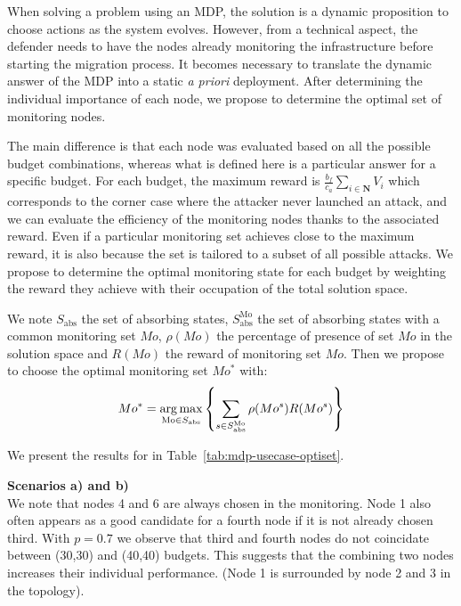 When solving a problem using an MDP, the solution is a dynamic proposition to choose actions as the system evolves.
However, from a technical aspect, the defender needs to have the nodes already monitoring the infrastructure before starting the migration process.
It becomes necessary to translate the dynamic answer of the MDP into a static \textit{a priori} deployment.
After determining the individual importance of each node, we propose to determine the optimal set of monitoring nodes.

The main difference is that each node was evaluated based on all the possible budget combinations, whereas what is defined here is a particular answer for a specific budget.
For each budget, the maximum reward is $\frac{b_f}{c_a} \sum\limits_{i \in \textbf{N}}V_i $ which corresponds to the corner case where the attacker never launched an attack, and we can evaluate the efficiency of the   monitoring nodes thanks to the associated reward.
Even if a particular monitoring set achieves close to the maximum reward, it is also because the set is tailored to a subset of all possible attacks.
We propose to determine the optimal monitoring state for each budget by weighting the reward they achieve with their occupation of the total solution space.

We note $S_{\text{abs}}$ the set of absorbing states, $S^{\text{Mo}}_{\text{abs}}$ the set of absorbing states with a common  monitoring set $Mo$, $\rho(Mo)$ the percentage of presence of set $Mo$ in the solution space and $R(Mo)$ the reward of monitoring set $Mo$.
Then we propose to choose the optimal monitoring set $Mo^*$ with:
\begin{equation}
    Mo^* = \operatorname*{arg\,max}\limits_{\text{Mo} \in S_{\text{abs}}} \left \{\sum\limits_{s \in S^{\text{Mo}}_{\text{abs}}}\rho(Mo^s)R(Mo^s) \right \}
\end{equation}

We present the results for in Table~\ref{tab:mdp-usecase-optiset}.


\textbf{Scenarios a) and b)\\}
We note that nodes 4 and 6 are always chosen in the monitoring.
Node 1 also often appears as a good candidate for a fourth node if it is not already chosen third.
With $p=0.7$ we observe that third and fourth nodes do not coincidate between (30,30) and (40,40) budgets.
This suggests that the combining two nodes increases their individual performance.
(Node 1 is surrounded by node 2 and 3 in the topology).

